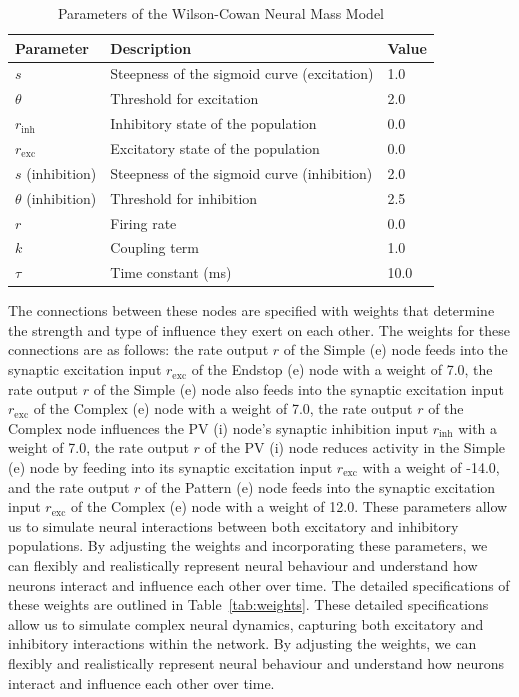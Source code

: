 \documentclass[12pt]{article}
\begin{document}
\begin{table}[h]
  \centering
  \caption{Parameters of the Wilson-Cowan Neural Mass Model}
  \label{tab:parameters}
  \begin{tabular}{@{}lll@{}}
      \toprule
      \textbf{Parameter} & \textbf{Description} & \textbf{Value} \\ \midrule
      \( s \) & Steepness of the sigmoid curve (excitation) & 1.0 \\
      \( \theta \) & Threshold for excitation & 2.0 \\
      \( r_{\mathrm{inh}} \) & Inhibitory state of the population & 0.0 \\
      \( r_{\mathrm{exc}} \) & Excitatory state of the population & 0.0 \\
      \( s \) (inhibition) & Steepness of the sigmoid curve (inhibition) & 2.0 \\
      \( \theta \) (inhibition) & Threshold for inhibition & 2.5 \\
      \( r \) & Firing rate & 0.0 \\
      \( k \) & Coupling term & 1.0 \\
      \( \tau \) & Time constant (ms) & 10.0 \\ \bottomrule
  \end{tabular}
\end{table}

The connections between these nodes are specified with weights that determine the strength and type of influence they exert on each other. The weights for these connections are as follows: the rate output \( r \) of the Simple (e) node feeds into the synaptic excitation input \( r_{\mathrm{exc}} \) of the Endstop (e) node with a weight of 7.0, the rate output \( r \) of the Simple (e) node also feeds into the synaptic excitation input \( r_{\mathrm{exc}} \) of the Complex (e) node with a weight of 7.0, the rate output \( r \) of the Complex node influences the PV (i) node's synaptic inhibition input \( r_{\mathrm{inh}} \) with a weight of 7.0, the rate output \( r \) of the PV (i) node reduces activity in the Simple (e) node by feeding into its synaptic excitation input \( r_{\mathrm{exc}} \) with a weight of -14.0, and the rate output \( r \) of the Pattern (e) node feeds into the synaptic excitation input \( r_{\mathrm{exc}} \) of the Complex (e) node with a weight of 12.0. These parameters allow us to simulate neural interactions between both excitatory and inhibitory populations. By adjusting the weights and incorporating these parameters, we can flexibly and realistically represent neural behaviour and understand how neurons interact and influence each other over time. The detailed specifications of these weights are outlined in Table~\ref{tab:weights}. These detailed specifications allow us to simulate complex neural dynamics, capturing both excitatory and inhibitory interactions within the network. By adjusting the weights, we can flexibly and realistically represent neural behaviour and understand how neurons interact and influence each other over time.
\end{document}
